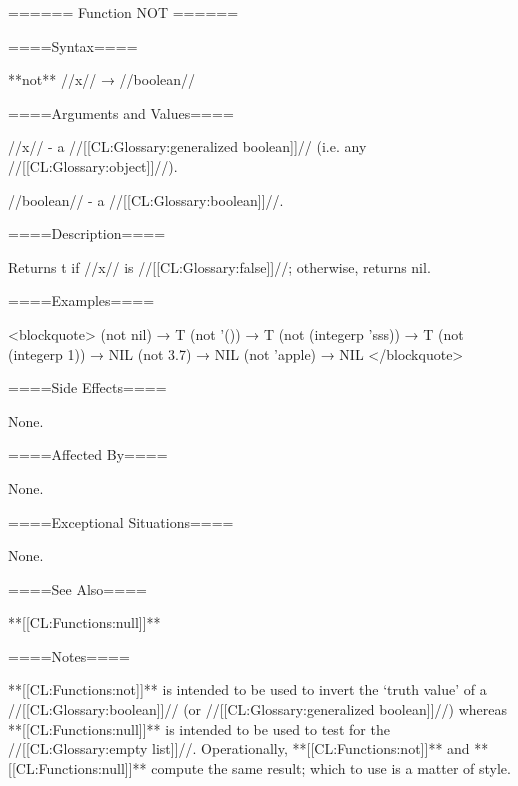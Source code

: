 ====== Function NOT ======

====Syntax====

**not** //x// → //boolean//

====Arguments and Values====

//x// - a //[[CL:Glossary:generalized boolean]]// (i.e. any //[[CL:Glossary:object]]//).

//boolean// - a //[[CL:Glossary:boolean]]//.

====Description====

Returns t if //x// is //[[CL:Glossary:false]]//; otherwise, returns nil.

====Examples====

<blockquote> (not nil) → T (not '()) → T (not (integerp 'sss)) → T (not (integerp 1)) → NIL (not 3.7) → NIL (not 'apple) → NIL </blockquote>

====Side Effects====

None.

====Affected By====

None.

====Exceptional Situations====

None.

====See Also====

**[[CL:Functions:null]]**

====Notes====

**[[CL:Functions:not]]** is intended to be used to invert the `truth value' of a //[[CL:Glossary:boolean]]// (or //[[CL:Glossary:generalized boolean]]//) whereas **[[CL:Functions:null]]** is intended to be used to test for the //[[CL:Glossary:empty list]]//. Operationally, **[[CL:Functions:not]]** and **[[CL:Functions:null]]** compute the same result; which to use is a matter of style.

